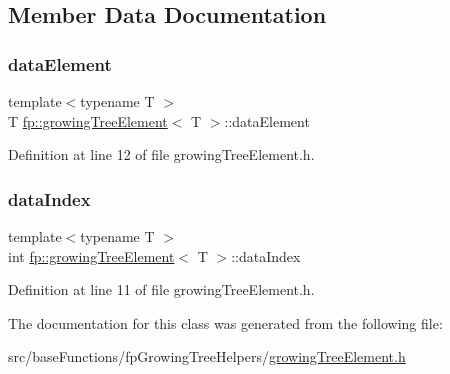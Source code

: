 \subsection{Member Data Documentation}
\mbox{\label{classfp_1_1growingTreeElement_ae56213ef46269673e10a4046d7cfc7e4}} 
\subsubsection{\texorpdfstring{data\+Element}{dataElement}}
{\footnotesize\ttfamily template$<$typename T $>$ \\
T \hyperlink{classfp_1_1growingTreeElement}{fp\+::growing\+Tree\+Element}$<$ T $>$\+::data\+Element\hspace{0.3cm}{\ttfamily [protected]}}



Definition at line 12 of file growing\+Tree\+Element.\+h.

\mbox{\label{classfp_1_1growingTreeElement_a8ba52aff2a9d11fa59a2544fd05c7d45}} 
\subsubsection{\texorpdfstring{data\+Index}{dataIndex}}
{\footnotesize\ttfamily template$<$typename T $>$ \\
int \hyperlink{classfp_1_1growingTreeElement}{fp\+::growing\+Tree\+Element}$<$ T $>$\+::data\+Index\hspace{0.3cm}{\ttfamily [protected]}}



Definition at line 11 of file growing\+Tree\+Element.\+h.



The documentation for this class was generated from the following file\+:\begin{DoxyCompactItemize}
\item 
src/base\+Functions/fp\+Growing\+Tree\+Helpers/\hyperlink{growingTreeElement_8h}{growing\+Tree\+Element.\+h}\end{DoxyCompactItemize}
